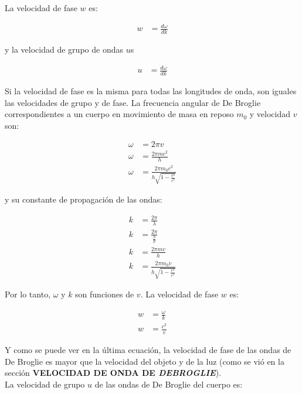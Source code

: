 \documentclass[a4paper]{article}
\begin{document}
    \indent La velocidad de fase \( w \) es:

    \begin{align}
        w &= \frac{d\omega}{dk} \tag*{}
    \end{align}

    \indent y la velocidad de grupo de ondas \( u \)s

    \begin{align}
        u &= \frac{d\omega}{dk} \tag*{}
    \end{align}

    \indent Si la velocidad de fase es la misma para todas las longitudes de onda, son iguales las velocidades de grupo y de fase. La frecuencia angular de De Broglie correspondientes a un cuerpo en movimiento de masa en reposo $m_0$ y velocidad $v$ son:

    \begin{align}
        \omega &= 2\pi v \tag*{} \\[10pt]
        \omega &= \frac{2 \pi mc^2}{h} \tag*{} \\[10pt]
        \omega &= \frac{2 \pi m_0 c^2}{h\sqrt{1-\frac{v^2}{c^2}}} \tag*{} 
    \end{align}

    \indent y su constante de propagación de las ondas:

    \begin{align}
        k &= \frac{2 \pi}{\lambda} \tag*{} \\[10pt]
        k &= \frac{2 \pi}{\frac{h}{p}} \tag*{} \\[10pt]
        k &= \frac{2 \pi mv}{h} \tag*{} \\[10pt]
        k &= \frac{2 \pi m_0 v}{h\sqrt{1-\frac{v^2}{c^2}}} \tag*{}
    \end{align}

    \indent Por lo tanto, $\omega$ y $k$ son funciones de $v$. La velocidad de fase $w$ es:

    \begin{align}
        w &= \frac{\omega}{k} \tag*{} \\[10pt]
        w &= \frac{c^2}{v} \tag*{}
    \end{align}

    \newpage
    \noindent
    \thispagestyle{fancy}

    \indent Y como se puede ver en la última ecuación, la velocidad de fase de las ondas de De Broglie es mayor que la velocidad del objeto y de la luz (como se vió en la sección \textbf{VELOCIDAD DE ONDA DE \textit{DEBROGLIE}}).\\
    \indent La velocidad de grupo $u$ de las ondas de De Broglie del cuerpo es: 
\end{document}
